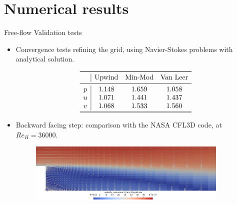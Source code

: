 \documentclass{beamer}
\begin{document}
\section{Numerical results}
\begin{frame}{Free-flow Validation tests}
\begin{itemize}
	\item Convergence tests refining the grid, using Navier-Stokes problems 
	with analytical solution.
	\vspace{-0.3cm}
	\begin{table}\scriptsize
		\[
		\begin{array}{c|ccc}
		\toprule
		& \text{Upwind} & \text{Min-Mod} & \text{Van Leer} \\ 
		\midrule
		p & 1.148 & 1.659 & 1.058\\
		u & 1.071 & 1.441 & 1.437\\
		v & 1.068 & 1.533 & 1.560\\
		\bottomrule
		\end{array}
		\]
	\end{table}
	\item Backward facing step: comparison with the NASA CFL3D code, at 
	$Re_H=36000$.
	\begin{figure}
		\centering
		\includegraphics[width=0.9\textwidth]{bfs_glimphs.png}
	\end{figure}
\end{itemize}
\end{frame}
%	
\end{document}

